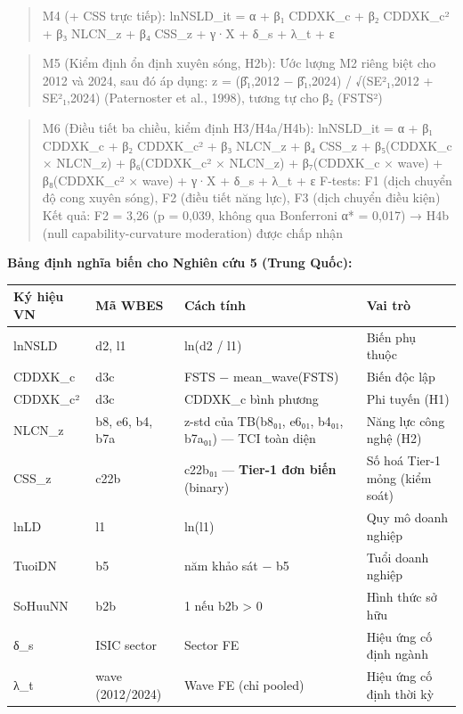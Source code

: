 \documentclass[12pt,a4paper]{article}
\begin{document}
\begin{quote}
M4 (+ CSS trực tiếp): lnNSLD\_it = α + β₁ CDDXK\_c + β₂ CDDXK\_c² + β₃
NLCN\_z + β₄ CSS\_z + γ·X + δ\_s + λ\_t + ε
\end{quote}

\begin{quote}
M5 (Kiểm định ổn định xuyên sóng, H2b): Ước lượng M2 riêng biệt cho 2012
và 2024, sau đó áp dụng: z = (β̂₁,2012 − β̂₁,2024) / √(SE²₁,2012 +
SE²₁,2024) (Paternoster et al., 1998), tương tự cho β₂ (FSTS²)
\end{quote}

\begin{quote}
M6 (Điều tiết ba chiều, kiểm định H3/H4a/H4b): lnNSLD\_it = α + β₁
CDDXK\_c + β₂ CDDXK\_c² + β₃ NLCN\_z + β₄ CSS\_z + β₅(CDDXK\_c ×
NLCN\_z) + β₆(CDDXK\_c² × NLCN\_z) + β₇(CDDXK\_c × wave) + β₈(CDDXK\_c²
× wave) + γ·X + δ\_s + λ\_t + ε F-tests: F1 (dịch chuyển độ cong xuyên
sóng), F2 (điều tiết năng lực), F3 (dịch chuyển điều kiện) Kết quả: F2 =
3,26 (p = 0,039, không qua Bonferroni α* = 0,017) → H4b (null
capability-curvature moderation) được chấp nhận
\end{quote}

\textbf{Bảng định nghĩa biến cho Nghiên cứu 5 (Trung Quốc):}

\begin{longtable}[]{@{}llll@{}}
\toprule\noalign{}
Ký hiệu VN & Mã WBES & Cách tính & Vai trò \\
\midrule\noalign{}
\endhead
\bottomrule\noalign{}
\endlastfoot
lnNSLD & d2, l1 & ln(d2 / l1) & Biến phụ thuộc \\
CDDXK\_c & d3c & FSTS − mean\_wave(FSTS) & Biến độc lập \\
CDDXK\_c² & d3c & CDDXK\_c bình phương & Phi tuyến (H1) \\
NLCN\_z & b8, e6, b4, b7a & z-std của TB(b8₀₁, e6₀₁, b4₀₁, b7a₀₁) ---
TCI toàn diện & Năng lực công nghệ (H2) \\
CSS\_z & c22b & c22b₀₁ --- \textbf{Tier-1 đơn biến} (binary) & Số hoá
Tier-1 mỏng (kiểm soát) \\
lnLD & l1 & ln(l1) & Quy mô doanh nghiệp \\
TuoiDN & b5 & năm khảo sát − b5 & Tuổi doanh nghiệp \\
SoHuuNN & b2b & 1 nếu b2b \textgreater{} 0 & Hình thức sở hữu \\
δ\_s & ISIC sector & Sector FE & Hiệu ứng cố định ngành \\
λ\_t & wave (2012/2024) & Wave FE (chỉ pooled) & Hiệu ứng cố định thời
kỳ \\
\end{longtable}
\end{document}
